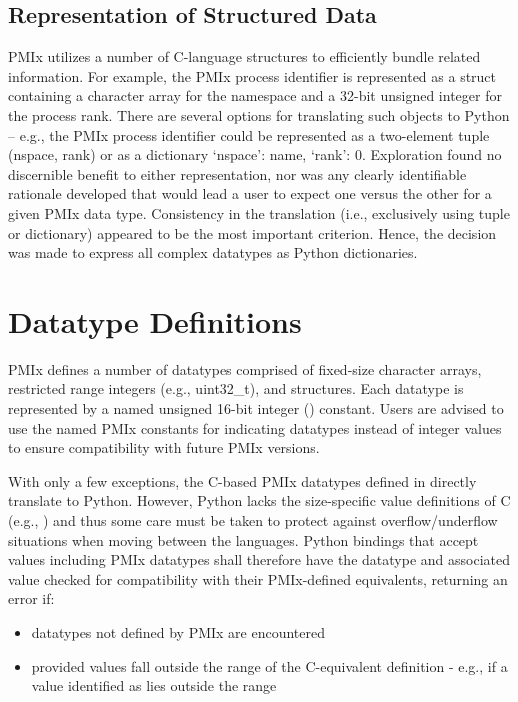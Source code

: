 \subsection{Representation of Structured Data}
\label{app:python:rep}

\ac{PMIx} utilizes a number of C-language structures to efficiently bundle related information. For example, the \ac{PMIx} process identifier is represented as a struct containing a character array for the namespace and a 32-bit unsigned integer for the process rank. There are several options for translating such objects to Python – e.g., the \ac{PMIx} process identifier could be represented as a two-element tuple (nspace, rank) or as a dictionary {‘nspace’: name, ‘rank’: 0}. Exploration found no discernible benefit to either representation, nor was any clearly identifiable rationale developed that would lead a user to expect one versus the other for a given \ac{PMIx} data type. Consistency in the translation (i.e., exclusively using tuple or dictionary) appeared to be the most important criterion. Hence, the decision was made to express all complex datatypes as Python dictionaries.

\section{Datatype Definitions}
\label{app:python:types}

\ac{PMIx} defines a number of datatypes comprised of fixed-size character arrays, restricted range integers (e.g., uint32_t), and structures. Each datatype is represented by a named unsigned 16-bit integer () constant. Users are advised to use the named \ac{PMIx} constants for indicating datatypes instead of integer values to ensure compatibility with future PMIx versions.

With only a few exceptions, the C-based \ac{PMIx} datatypes defined in  directly translate to Python. However, Python lacks the size-specific value definitions of C (e.g., ) and thus some care must be taken to protect against overflow/underflow situations when moving between the languages. Python bindings that accept values including \ac{PMIx} datatypes shall therefore have the datatype and associated value checked for compatibility with their \ac{PMIx}-defined equivalents, returning an error if:

\begin{itemize}
    \item datatypes not defined by \ac{PMIx} are encountered
    \item provided values fall outside the range of the C-equivalent definition - e.g., if a value identified as  lies outside the range
\end{itemize}

